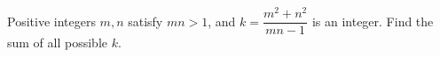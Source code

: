 Positive integers $ m,n $ satisfy $ mn>1 $, and $ k=\dfrac{m^2+n^2}{mn-1}$ is an integer. Find the sum of all possible $ k $.
